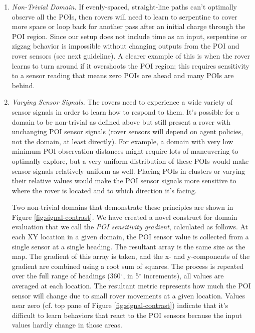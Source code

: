 \documentclass[letterpaper, 10 pt, conference]{ieeeconf}  %
\begin{document}
\begin{enumerate}
\item \emph{Non-Trivial Domain.} If evenly-spaced, straight-line paths can't optimally observe all the POIs, then rovers will need to learn to serpentine to cover more space or loop back for another pass after an initial charge through the POI region. Since our setup does not include time as an input, serpentine or zigzag behavior is impossible without changing outputs from the POI and rover sensors (see next guideline). A clearer example of this is when the rover learns to turn around if it overshoots the POI region; this requires sensitivity to a sensor reading that means zero POIs are ahead and many POIs are behind. 

\item \emph{Varying Sensor Signals.} The rovers need to experience a wide variety of sensor signals in order to learn how to respond to them. It's possible for a domain to be non-trivial as defined above but still present a rover with unchanging POI sensor signals (rover sensors will depend on agent policies, not the domain, at least directly). For example, a domain with very low minimum POI observation distances might require lots of maneuvering to optimally explore, but a very uniform distribution of these POIs would make sensor signals relatively uniform as well. Placing POIs in clusters or varying their relative values would make the POI sensor signals more sensitive to where the rover is located and to which direction it's facing. 

Two non-trivial domains that demonstrate these principles are shown in Figure \ref{fig:signal-contrast}. We have created a novel construct for domain evaluation that we call the \emph{POI sensitivity gradient}, calculated as follows. At each XY location in a given domain, the POI sensor value is collected from a single sensor at a single heading. The resultant array is the same size as the map. The gradient of this array is taken, and the x- and y-components of the gradient are combined using a root sum of squares. The process is repeated over the full range of headings (360$^{\circ}$, in 5$^{\circ}$ increments), all values are averaged at each location. The resultant metric represents how much the POI sensor will change due to small rover movements at a given location. Values near zero (cf. top pane of Figure \ref{fig:signal-contrast}) indicate that it's difficult to learn behaviors that react to the POI sensors because the input values hardly change in those areas. 


\end{enumerate}
\end{document}
